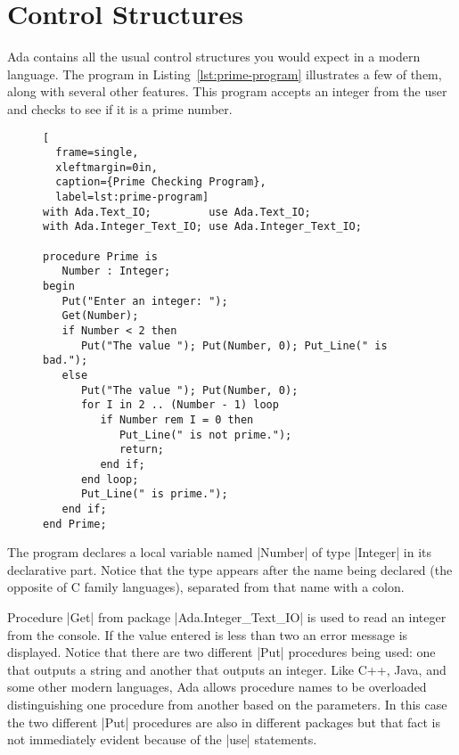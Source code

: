 \section{Control Structures}
\label{sec:control-structures}

Ada contains all the usual control structures you would expect in a modern language. The program
in Listing~\ref{lst:prime-program} illustrates a few of them, along with several other features.
This program accepts an integer from the user and checks to see if it is a prime number.

\begin{figure}[tbhp]
\begin{lstlisting}[
  frame=single,
  xleftmargin=0in,
  caption={Prime Checking Program},
  label=lst:prime-program]
with Ada.Text_IO;         use Ada.Text_IO;
with Ada.Integer_Text_IO; use Ada.Integer_Text_IO;

procedure Prime is
   Number : Integer;
begin
   Put("Enter an integer: ");
   Get(Number);
   if Number < 2 then
      Put("The value "); Put(Number, 0); Put_Line(" is bad.");
   else
      Put("The value "); Put(Number, 0);
      for I in 2 .. (Number - 1) loop
         if Number rem I = 0 then
            Put_Line(" is not prime.");
            return;
         end if;
      end loop;
      Put_Line(" is prime.");
   end if;
end Prime;
\end{lstlisting}    
\end{figure}

The program declares a local variable named |Number| of type |Integer| in its declarative part.
Notice that the type appears after the name being declared (the opposite of C family languages),
separated from that name with a colon.

Procedure |Get| from package |Ada.Integer_Text_IO| is used to read an integer from the console.
If the value entered is less than two an error message is displayed. Notice that there are two
different |Put| procedures being used: one that outputs a string and another that outputs an
integer. Like C++, Java, and some other modern languages, Ada allows procedure names to be
overloaded distinguishing one procedure from another based on the parameters. In this case the
two different |Put| procedures are also in different packages but that fact is not immediately
evident because of the |use| statements.

